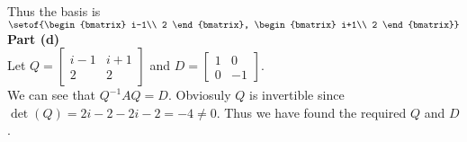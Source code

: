 \documentclass[answers,12pt,addpoints]{exam}
\begin{document}
\begin{questions}
\begin{solution}
        Thus the basis is $\setof{\begin{bmatrix}
            i-1\\
            2
        \end{bmatrix}, \begin{bmatrix}
            i+1\\
            2
        \end{bmatrix}}$\\
        \textbf{Part (d)}\\
        Let $Q = \begin{bmatrix}
            i-1 & i+1\\
            2 & 2
        \end{bmatrix}$ and $D = \begin{bmatrix}
            1 & 0\\
            0 & -1
        \end{bmatrix}$.\\
        We can see that $Q^{-1}AQ = D$.
        Obviosuly $Q$ is invertible since $\det(Q) = 2i - 2 - 2i - 2 = -4 \neq 0$.
        Thus we have found the required $Q$ and $D$.
    \end{solution}


\end{questions}
\end{document}
